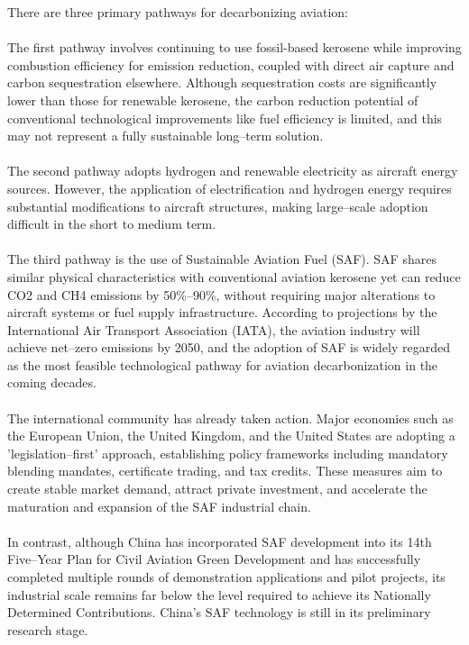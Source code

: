 \documentclass[a4paper,11pt]{article}
\begin{document}
There are three primary pathways for decarbonizing aviation:\\
\\
The first pathway involves continuing to use fossil-based kerosene while improving combustion efficiency for emission reduction, coupled with direct air capture and carbon sequestration elsewhere. Although sequestration costs are significantly lower than those for renewable kerosene, the carbon reduction potential of conventional technological improvements like fuel efficiency is limited, and this may not represent a fully sustainable long--term solution.\\
\\
The second pathway adopts hydrogen and renewable electricity as aircraft energy sources. However, the application of electrification and hydrogen energy requires substantial modifications to aircraft structures, making large--scale adoption difficult in the short to medium term.\\
\\
The third pathway is the use of Sustainable Aviation Fuel (SAF). SAF shares similar physical characteristics with conventional aviation kerosene yet can reduce CO2 and CH4 emissions by 50\%--90\%, without requiring major alterations to aircraft systems or fuel supply infrastructure. According to projections by the International Air Transport Association (IATA), the aviation industry will achieve net--zero emissions by 2050, and the adoption of SAF is widely regarded as the most feasible technological pathway for aviation decarbonization in the coming decades.\\
\\
The international community has already taken action. Major economies such as the European Union, the United Kingdom, and the United States are adopting a 'legislation--first' approach, establishing policy frameworks including mandatory blending mandates, certificate trading, and tax credits. These measures aim to create stable market demand, attract private investment, and accelerate the maturation and expansion of the SAF industrial chain.\\
\\
In contrast, although China has incorporated SAF development into its 14th Five--Year Plan for Civil Aviation Green Development \cite{caac2021} and has successfully completed multiple rounds of demonstration applications and pilot projects, its industrial scale remains far below the level required to achieve its Nationally Determined Contributions. China's SAF technology is still in its preliminary research stage.\\
\end{document}
